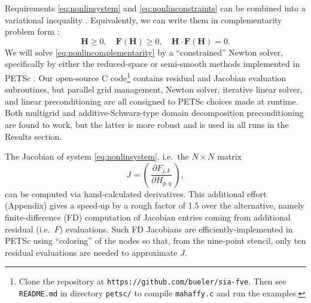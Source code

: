 \documentclass[twocolumn,a4paper]{igs}
\newcommand\bF{\mathbf{F}}
\newcommand\bH{\mathbf{H}}
\begin{document}
Requirements \eqref{eq:nonlinsystem} and \eqref{eq:nonlinconstraints} can be combined into a variational inequality \citep{JouvetBueler2012,KinderlehrerStampacchia1980}.  Equivalently, we can write them in complementarity problem form \citep{BensonMunson2006}:
\begin{equation}
\bH \ge 0, \quad \bF(\bH) \ge 0, \quad \bH \cdot \bF(\bH) = 0.  \label{eq:nonlincomplementarity}
\end{equation}
We will solve \eqref{eq:nonlincomplementarity} by a ``constrained'' Newton solver, specifically by either the reduced-space or semi-smooth methods \citep{BensonMunson2006} implemented in PETSc \citep{Balayetal2014}.  Our open-source C code\footnote{Clone the repository at \texttt{https://github.com/bueler/sia-fve}.  Then see \texttt{README.md} in directory \texttt{petsc/} to compile \texttt{mahaffy.c} and run the examples.} contains residual and Jacobian evaluation subroutines, but parallel grid management, Newton solver, iterative linear solver, and linear preconditioning are all consigned to PETSc choices made at runtime.  Both multigrid \citep{Briggsetal2000} and additive-Schwarz-type domain decomposition \citep{Smithetal1996} preconditioning are found to work, but the latter is more robust and is used in all runs in the Results section.

The Jacobian of system \eqref{eq:nonlinsystem}, i.e.~the $N\times N$ matrix
\begin{equation}
J = \left(\,\frac{\partial F_{j,k}}{\partial H_{p,q}}\,\right), \label{eq:nonlinjacobian}
\end{equation}
can be computed via hand-calculated derivatives.  This additional effort (Appendix) gives a speed-up by a rough factor of 1.5 over the alternative, namely finite-difference (FD) computation of Jacobian entries coming from additional residual (i.e.~$F$) evaluations.  Such FD Jacobians are efficiently-implemented in PETSc using ``coloring'' of the nodes \citep{CurtisPowellReid1974} so that, from the nine-point stencil, only ten residual evaluations are needed to approximate $J$.
\end{document}
